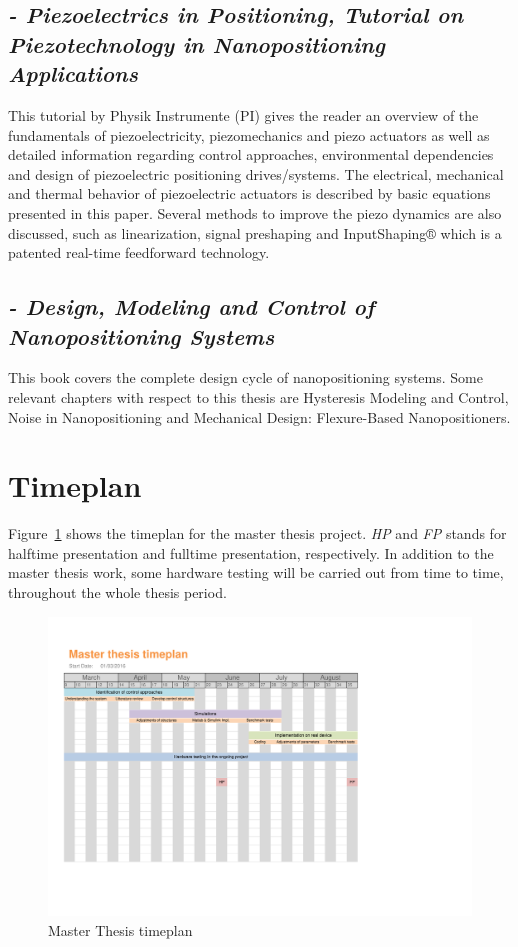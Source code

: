 \subsection*{\citep*{Piezo:2008} {\small \emph{- Piezoelectrics in Positioning, Tutorial on Piezotechnology in Nanopositioning Applications}} }
This tutorial by Physik Instrumente (PI) gives the reader an overview of the fundamentals of piezoelectricity, piezomechanics and piezo actuators as well as detailed information regarding control approaches, environmental dependencies and design of piezoelectric positioning drives/systems. The electrical, mechanical and thermal behavior of piezoelectric actuators is described by basic equations presented in this paper. Several methods to improve the piezo dynamics are also discussed, such as linearization, signal preshaping and InputShaping® which is a patented real-time feedforward technology.

\subsection*{\citep*{FlemingLeang:2014} {\small \emph{- Design, Modeling and Control of Nanopositioning Systems}} }
This book covers the complete design cycle of nanopositioning systems. Some relevant chapters with respect to this thesis are Hysteresis Modeling and Control, Noise in Nanopositioning and Mechanical Design: Flexure-Based Nanopositioners.


\section{Timeplan}
Figure~\ref{fig:timeplan} shows the timeplan for the master thesis project. \emph{HP} and \emph{FP} stands for halftime presentation and fulltime presentation, respectively. In addition to the master thesis work, some hardware testing will be carried out from time to time, throughout the whole thesis period.

\begin{figure}[h] %
 \centering %
 \includegraphics[trim=1cm 12cm 5cm 5.5cm, clip=true, scale=0.42]{fig/timeplan}
 \caption{\label{fig:timeplan}%
 Master Thesis timeplan}
 \end{figure}
